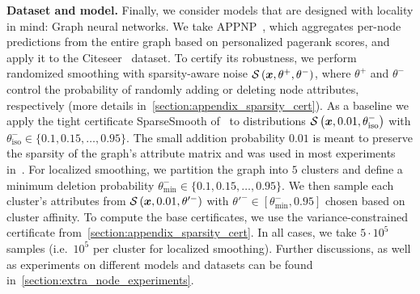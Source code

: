 \documentclass{article} %
\theoremstyle{plain}
\theoremstyle{definition}
\theoremstyle{remark}
\begin{document}
\textbf{Dataset and model.}
Finally, we
consider models that are
designed with locality in mind: Graph neural networks.
We take APPNP~\citep{klicpera2019predict}, which aggregates per-node predictions from the entire graph based on personalized pagerank scores, and apply it  to the Citeseer~\citep{Sen2008} dataset.
To certify its robustness, we perform randomized smoothing with sparsity-aware noise
$\mathcal{S}\left({\bm{x}}, \theta^{+}, \theta^{-}\right)$, where $\theta^{+}$ and $\theta^{-}$ control the probability
of randomly adding or deleting node attributes, respectively (more details in~\autoref{section:appendix_sparsity_cert}).
As a baseline %
we apply the tight certificate SparseSmooth of~\citet{Bojchevski2020} to distributions
$\mathcal{S}\left({\bm{x}}, 0.01, \theta^{-}_\mathrm{iso}\right)$
with $\theta^{-}_\mathrm{iso} \in \{0.1, 0.15, \dots, 0.95\}$.
The
small addition probability $0.01$  is meant to preserve the sparsity of the graph's attribute matrix and was used in most experiments in~\citep{Bojchevski2020}.
For localized smoothing, we partition the graph into $5$ clusters and define a minimum deletion probability $\theta^{-}_\mathrm{min} \in \{0.1, 0.15, \dots, 0.95\}$.
We then sample each cluster's attributes from
$\mathcal{S}\left({\bm{x}}, 0.01, \theta'^{-}\right)$
with $\theta'^{-} \in \left[\theta^{-}_\mathrm{min},0.95\right]$ 
chosen based on cluster affinity.
To compute the base certificates, we use the variance-constrained certificate from~\autoref{section:appendix_sparsity_cert}.
In all cases, we take $5 \cdot 10^5$ samples (i.e.~$10^5$ per cluster for localized smoothing).
Further discussions, as well as experiments on different models and datasets can be found in~\autoref{section:extra_node_experiments}.
\end{document}
